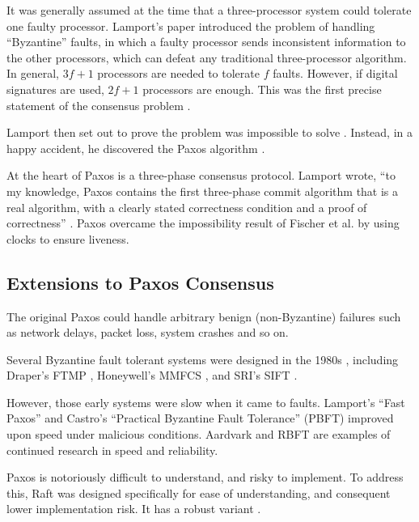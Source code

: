 It was generally assumed at the time that a three-processor system could tolerate one faulty processor.
Lamport’s paper introduced the problem of handling “Byzantine” faults, in which a faulty processor sends inconsistent information to the other processors, which can defeat any traditional three-processor algorithm.
In general, $3f+1$ processors are needed to tolerate $f$ faults.
However, if digital signatures are used, $2f+1$ processors are enough.
This was the first precise statement of the consensus problem \cite{lamport1982byzantine}.

Lamport then set out to prove the problem was impossible to solve \cite{lamport_writings}.
Instead, in a happy accident, he discovered the Paxos algorithm \cite{lamport1998part}.

At the heart of Paxos is a three-phase consensus protocol.
Lamport wrote, “to my knowledge, Paxos contains the first three-phase commit algorithm that is a real algorithm, with a clearly stated correctness condition and a proof of correctness” \cite{lamport_writings}.
Paxos overcame the impossibility result of Fischer et al. \cite{fischer1985impossibility} by using clocks to ensure liveness.

\subsection{Extensions to Paxos Consensus}
The original Paxos could handle arbitrary benign (non-Byzantine) failures such as network delays, packet loss, system crashes and so on.

Several Byzantine fault tolerant systems were designed in the 1980s \cite{wiki_byzantine}, including Draper's FTMP \cite{paulitsch2005coverage}, Honeywell's MMFCS \cite{hopkins1987evolution}, and SRI's SIFT \cite{driscoll1983multi}.

However, those early systems were slow when it came to faults.
Lamport’s “Fast Paxos” \cite{lamport2006fast} and Castro’s “Practical Byzantine Fault Tolerance” (PBFT) \cite{castro2001byzantine} improved upon speed under malicious conditions.
Aardvark \cite{clement2009making} and RBFT \cite{aublin2013rbft} are examples of continued research in speed and reliability.

Paxos is notoriously difficult to understand, and risky to implement.
To address this, Raft \cite{ongaro2014raft} was designed specifically for ease of understanding, and consequent lower implementation risk.
It has a robust variant \cite{copeland2014tangaroa}.


